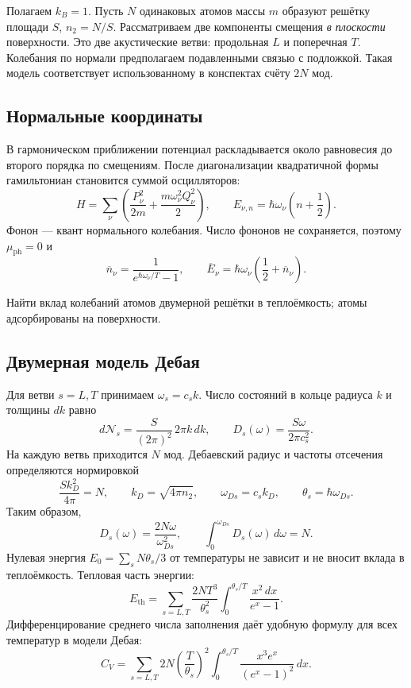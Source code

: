 \documentclass[../final.tex]{subfiles}
\begin{document}
\enlargethispage{-2\baselineskip}

Полагаем $k_B=1$. Пусть $N$ одинаковых атомов массы $m$ образуют
решётку площади $S$, $n_2=N/S$. Рассматриваем две компоненты
смещения \emph{в плоскости} поверхности. Это две акустические ветви:
продольная $L$ и поперечная $T$. Колебания по нормали предполагаем
подавленными связью с подложкой. Такая модель соответствует
использованному в конспектах счёту $2N$ мод.

\subsection*{Нормальные координаты}
В гармоническом приближении потенциал раскладывается около
равновесия до второго порядка по смещениям. После диагонализации
квадратичной формы гамильтониан становится суммой осцилляторов:
\[
 H=\sum_\nu\left(\frac{P_\nu^2}{2m}
 +\frac{m\omega_\nu^2Q_\nu^2}{2}\right),\qquad
 E_{\nu,n}=\hbar\omega_\nu\left(n+\frac12\right).
\]
Фонон --- квант нормального колебания. Число фононов не сохраняется,
поэтому $\mu_{\mathrm{ph}}=0$ и
\[
 \overline n_\nu=\frac1{e^{\hbar\omega_\nu/T}-1},\qquad
 \overline E_\nu=\hbar\omega_\nu\left(\frac12+\overline n_\nu\right).
\]

\condition
Найти вклад колебаний атомов двумерной решётки в теплоёмкость;
атомы адсорбированы на поверхности.

\subsection*{Двумерная модель Дебая}
Для ветви $s=L,T$ принимаем $\omega_s=c_sk$. Число состояний
в кольце радиуса $k$ и толщины $dk$ равно
\[
 d\mathcal N_s=\frac{S}{(2\pi)^2}\,2\pi k\,dk,
 \qquad D_s(\omega)=\frac{S\omega}{2\pi c_s^2}.
\]
На каждую ветвь приходится $N$ мод. Дебаевский радиус и частоты
отсечения определяются нормировкой
\[
 \frac{S k_D^2}{4\pi}=N,\qquad
 k_D=\sqrt{4\pi n_2},\qquad
 \omega_{Ds}=c_s k_D,\qquad\theta_s=\hbar\omega_{Ds}.
\]
Таким образом,
\[
 D_s(\omega)=\frac{2N\omega}{\omega_{Ds}^2},\qquad
 \int_0^{\omega_{Ds}}D_s(\omega)\,d\omega=N.
\]
Нулевая энергия $E_0=\sum_sN\theta_s/3$ от температуры не зависит
и не вносит вклада в теплоёмкость. Тепловая часть энергии:
\[
 E_{\mathrm{th}}=
 \sum_{s=L,T}\frac{2NT^3}{\theta_s^2}
 \int_0^{\theta_s/T}\frac{x^2\,dx}{e^x-1}.
\]
Дифференцирование среднего числа заполнения даёт удобную формулу
для всех температур в модели Дебая:
\[
 C_V=\sum_{s=L,T}2N\left(\frac{T}{\theta_s}\right)^2
 \int_0^{\theta_s/T}\frac{x^3e^x}{(e^x-1)^2}\,dx.
\]
\end{document}
